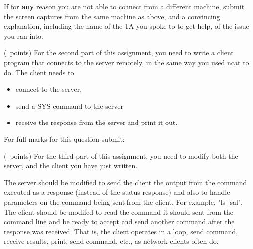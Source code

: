 \documentclass[9pt, addpoints]{exam}
\begin{document}
\begin{questions}
\begin{parts}
     If for \textbf{any} reason you are not able to connect from a different machine,
     submit the screen captures from the same machine as above, and a convincing explanation,
     including the name of the TA you spoke to to get help, of the issue you ran into.
 \end{parts}

\newpage

    \question(\totalpoints\ points)
     For the second part of this assignment, you need to write a client
     program that connects to the server remotely, in the same way you used
     ncat to do. The client needs to
     \begin{itemize}
          \item connect to the server,
          \item send a SYS command to the server
          \item receive the response from the server and print it out.
     \end{itemize}
          
     For full marks for this question submit:



 \question(\totalpoints\ points)
      For the third part of this assignment, you need to modify both the server,
      and the client you have just written. 

      The server should be modified to send the client the output from the command
      executed as a response (instead of the status response) and also to handle parameters on the command being sent
      from the client. For example, "ls -sal". The client should be modifed to read the command it should sent from the command line and be ready to accept and send
      another command after the response was received. That is, the client operates in a loop, send command, receive
      results, print, send command, etc., as network clients often do.


\end{questions}
\end{document}
